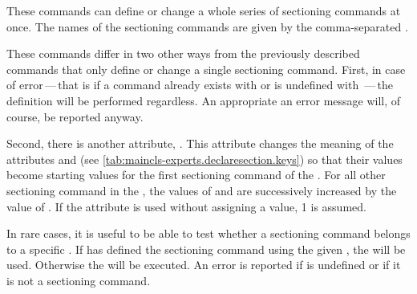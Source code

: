 \begin{Declaration}
\end{Declaration}
These commands can define or change a whole series of
sectioning commands at once. The names of the sectioning commands are given by
the comma-separated .

These commands differ in two other ways from the previously described commands
that only define or change a single sectioning command. First, in case of
error\,---\,that is if a command already exists with
 or is undefined with
\,---\,the definition will be performed
regardless. An appropriate an error message will, of course, be reported
anyway.

Second, there is another attribute,
. This
attribute changes the meaning of the attributes  and
 (see \autoref{tab:maincls-experts.declaresection.keys}) so
that their values become starting values for the first sectioning command of
the . For all other sectioning command in the , the values of  and  are successively
increased by the value of . If the
 attribute is used without assigning a value, 1 is
assumed.%
\EndIndexGroup


\begin{Declaration}
\end{Declaration}
In
rare cases, it is useful to be able to test whether a sectioning command
belongs to a specific . If \KOMAScript{} has defined the
sectioning command  using the given , the
 will be used. Otherwise the  will be
executed. An error is reported if  is undefined or if it
is not a \KOMAScript{} sectioning command.%
\EndIndexGroup


